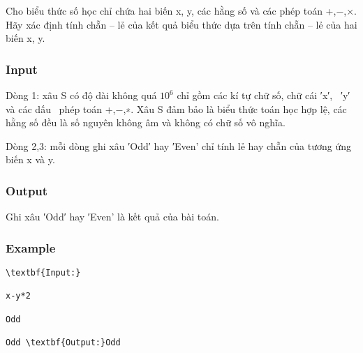 



   Cho biểu thức số học chỉ chứa hai biến x, y, các hằng số và các phép toán +,−,×. Hãy xác định tính chẵn – lẻ của kết quả biểu thức dựa trên tính chẵn – lẻ của hai biến x, y.  

\subsubsection{   Input  }

   Dòng 1: xâu S có độ dài không quá $10^{6}$   chỉ gồm các kí tự chữ số, chữ cái ′x′,  ′y′ và các dấu  phép toán +,−,∗. Xâu S đảm bảo là biểu thức toán học hợp lệ, các hằng số đều là số nguyên không âm và không có chữ số vô nghĩa.  

   Dòng 2,3: mỗi dòng ghi xâu ′Odd′ hay ′Even' chỉ tính lẻ hay chẵn của tương ứng biến x và y.  

\subsubsection{   Output  }

   Ghi xâu ′Odd′ hay ′Even' là kết quả của bài toán.  

\subsubsection{   Example  }
\begin{verbatim}
\textbf{Input:}

x-y*2

Odd

Odd \textbf{Output:}Odd\end{verbatim}
